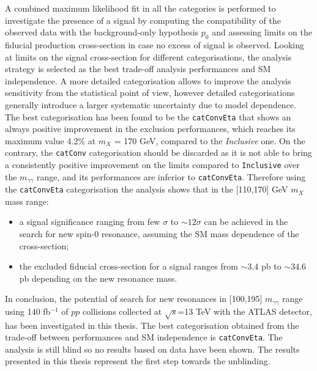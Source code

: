 \documentclass[a4paper, oneside, 11pt, openright]{book}
\begin{document}
		A combined maximum likelihood fit in all the categories is performed to investigate the presence of a signal by computing the compatibility of the observed data with the background-only hypothesis $p_0$ \cite{Statistic} and assessing limits \cite{Statistic} on the fiducial production cross-section in case no excess of signal is observed. Looking at limits on the signal cross-section for different categorisations, the analysis strategy is selected as the best trade-off analysis performances and SM independence. A more detailed categorisation allows to improve the analysis sensitivity from the statistical point of view, however detailed categorisations generally introduce a larger systematic uncertainty due to model dependence. The best categorisation has been found to be the \texttt{catConvEta} that shows an always positive improvement in the exclusion performances, which reaches its maximum value 4.2\% at $m_X$ = 170 GeV, compared to the \textit{Inclusive} one. On the contrary, the \texttt{catConv} categorisation should be discarded as it is not able to bring a consistently positive improvement on the limits compared to \texttt{Inclusive} over the $m_{\gamma\gamma}$ range, and its performances are inferior to \texttt{catConvEta}. Therefore using the \texttt{catConvEta} categorisation the analysis shows that in the [110,170] GeV $m_X$ mass range:
		\begin{itemize}
			\item a signal significance ranging from few $\sigma$ to $\sim12\sigma$ can be achieved in the search for new spin-0 resonance, assuming the SM mass dependence of the cross-section;
			\item the excluded fiducial cross-section for a signal ranges from $\sim 3.4$ pb to $\sim 34.6$ pb depending on the new resonance mass.
		\end{itemize}
		
		In conclusion, the potential of search for new resonances in [100,195] $m_{\gamma\gamma}$ range using 140 fb$^{-1}$ of $pp$ collisions collected at $\sqrt{s}$=13 TeV with the ATLAS detector, has been investigated in this thesis. The best categorisation obtained from the trade-off between performances and SM independence is \texttt{catConvEta}. The analysis is still blind so no results based on data have been shown. The results presented in this thesis represent the first step towards the unblinding.
		
		
		
 			
\end{document}

